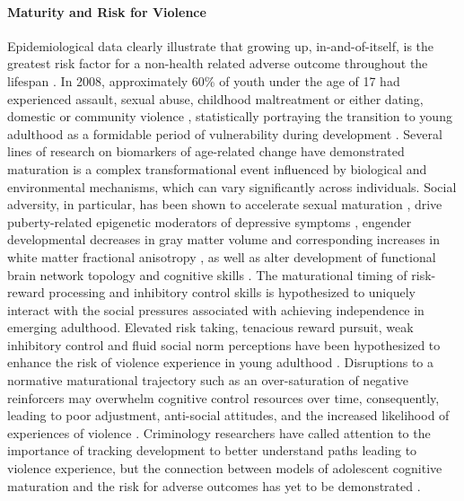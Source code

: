 \documentclass{article}%
\begin{document}
\paragraph*{Maturity and Risk for Violence}
Epidemiological data clearly illustrate that growing up, in-and-of-itself, is the greatest risk factor for a non-health related adverse outcome throughout the lifespan \citep{turner2006effect}. In 2008, approximately 60\% of youth under the age of 17 had experienced assault, sexual abuse, childhood maltreatment or either dating, domestic or community violence \citep{finkelhor2009children}, statistically portraying the transition to young adulthood as a formidable period of vulnerability during development \citep{berzin2010vulnerability}. Several lines of research on biomarkers of age-related change have demonstrated maturation is a complex transformational event influenced by biological and environmental mechanisms, which can vary significantly across individuals. Social adversity, in particular, has been shown to accelerate sexual maturation \citep{rickard2014childhood}, drive puberty-related epigenetic moderators of depressive symptoms \citep{sumner2019early}, engender developmental decreases in gray matter volume and corresponding increases in white matter fractional anisotropy \citep{gur2019burden, Gogtay2004}, as well as alter development of functional brain network topology \citep{tooley2020associations} and cognitive skills \citep{mclaughlin2019childhood, belsky2019early}. The maturational timing of risk-reward processing and inhibitory control skills is hypothesized to uniquely interact with the social pressures associated with achieving independence in emerging adulthood. Elevated risk taking, tenacious reward pursuit, weak inhibitory control and fluid social norm perceptions have been hypothesized to enhance the risk of violence experience in young adulthood \citep{morgan2014relationship,hasking2007reinforcement}. Disruptions to a normative maturational trajectory such as an over-saturation of negative reinforcers may overwhelm cognitive control resources over time, consequently, leading to poor adjustment, anti-social attitudes, and the increased likelihood of experiences of violence \citep{raine2006neural,inzlicht2015emotional}. Criminology researchers have called attention to the importance of tracking development to better understand paths leading to violence experience, but the connection between models of adolescent cognitive maturation and the risk for adverse outcomes has yet to be demonstrated \citep{laub1993turning}.
%
\end{document}
